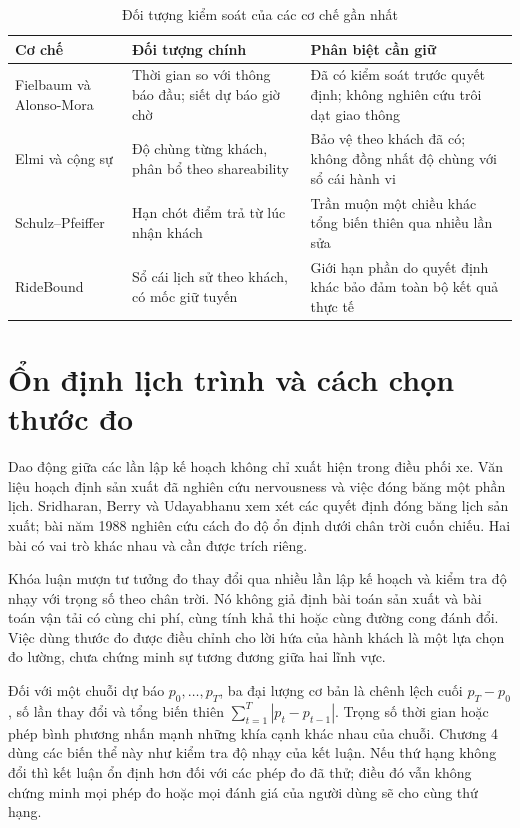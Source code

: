 \begin{table}[htbp]
\centering
\caption{Đối tượng kiểm soát của các cơ chế gần nhất}
\label{bang:ranhgioivanlieu}
\small
\begin{tabular}{@{}p{3.2cm}p{5.4cm}p{5.4cm}@{}}
\toprule
\textbf{Cơ chế} & \textbf{Đối tượng chính} & \textbf{Phân biệt cần giữ}\\
\midrule
Fielbaum và Alonso-Mora & Thời gian so với thông báo đầu; siết dự báo giờ chờ & Đã có kiểm
soát trước quyết định; không nghiên cứu trôi dạt giao thông\\[3pt]
Elmi và cộng sự & Độ chùng từng khách, phân bổ theo shareability & Bảo vệ theo khách đã có;
không đồng nhất độ chùng với sổ cái hành vi\\[3pt]
Schulz--Pfeiffer & Hạn chót điểm trả từ lúc nhận khách & Trần muộn một chiều khác tổng
biến thiên qua nhiều lần sửa\\[3pt]
RideBound & Sổ cái lịch sử theo khách, có mốc giữ tuyến & Giới hạn phần do quyết định
khác bảo đảm toàn bộ kết quả thực tế\\
\bottomrule
\end{tabular}
\end{table}

\section{Ổn định lịch trình và cách chọn thước đo}

Dao động giữa các lần lập kế hoạch không chỉ xuất hiện trong điều phối xe. Văn liệu
hoạch định sản xuất đã nghiên cứu nervousness và việc đóng băng một phần lịch.
Sridharan, Berry và Udayabhanu \cite{sridharan1987} xem xét các quyết định đóng băng
lịch sản xuất; bài năm 1988 \cite{sridharan1988} nghiên cứu cách đo độ ổn định dưới
chân trời cuốn chiếu. Hai bài có vai trò khác nhau và cần được trích riêng.

Khóa luận mượn tư tưởng đo thay đổi qua nhiều lần lập kế hoạch và kiểm tra độ nhạy với
trọng số theo chân trời. Nó không giả định bài toán sản xuất và bài toán vận tải có
cùng chi phí, cùng tính khả thi hoặc cùng đường cong đánh đổi. Việc dùng thước đo
được điều chỉnh cho lời hứa của hành khách là một lựa chọn đo lường, chưa chứng minh
sự tương đương giữa hai lĩnh vực.

Đối với một chuỗi dự báo $p_0,\ldots,p_T$, ba đại lượng cơ bản là chênh lệch cuối
$p_T-p_0$, số lần thay đổi và tổng biến thiên $\sum_{t=1}^T|p_t-p_{t-1}|$.
Trọng số thời gian hoặc phép bình phương nhấn mạnh những khía cạnh khác nhau của
chuỗi. Chương 4 dùng các biến thể này như kiểm tra độ nhạy của kết luận. Nếu thứ hạng
không đổi thì kết luận ổn định hơn đối với các phép đo đã thử; điều đó vẫn không
chứng minh mọi phép đo hoặc mọi đánh giá của người dùng sẽ cho cùng thứ hạng.

